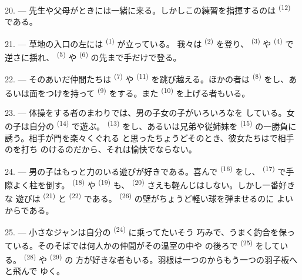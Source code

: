 20. --- 先生や父母がときには一緒に来る。しかしこの練習を指揮するのは
 \textsuperscript{(12)} である。

21. --- 草地の入口の左には \textsuperscript{(1)} が立っている。
我々は \textsuperscript{(2)} を登り、
\textsuperscript{(3)} や \textsuperscript{(4)} で逆さに揺れ、
 \textsuperscript{(5)} や \textsuperscript{(6)}
の先まで手だけで登る。

22. --- そのあいだ仲間たちは \textsuperscript{(7)} や
 \textsuperscript{(11)} を跳び越える。ほかの者は
\textsuperscript{(8)} をし、あるいは面をつけを持って
 \textsuperscript{(9)} をする。また \textsuperscript{(10)}
を上げる者もいる。

\VUsaut{4.6mm}
\VUsaut{3.0mm}

23. --- 体操をする者のまわりでは、男の子女の子がいろいろなを
している。女の子は自分の \textsuperscript{(14)} で遊ぶ。
 \textsuperscript{(13)} をし、あるいは兄弟や従姉妹を
 \textsuperscript{(15)} の一勝負に誘う。相手が門を楽々くぐれる
と思ったちょうどそのとき、彼女たちはで相手のを打ち
のけるのだから、それは愉快でならない。

24. --- 男の子はもっと力のいる遊びが好きである。喜んで
\textsuperscript{(16)} をし、 \textsuperscript{(17)} で手際よく柱を倒す。
 \textsuperscript{(18)} や \textsuperscript{(19)} も、
 \textsuperscript{(20)} さえも軽んじはしない。しかし一番好きな
遊びは \textsuperscript{(21)} と \textsuperscript{(22)}
である。 \textsuperscript{(26)} の壁がちょうど軽い球を弾ませるのに
よいからである。

25. --- 小さなジャンは自分の \textsuperscript{(24)} に乗ってたいそう
巧みで、うまく釣合を保っている。そのそばでは何人かの仲間がその温室の中や
の後ろで \textsuperscript{(25)} をしている。
 \textsuperscript{(28)} や \textsuperscript{(29)} の
方が好きな者もいる。羽根は一つのからもう一つの羽子板へと飛んで
ゆく。


